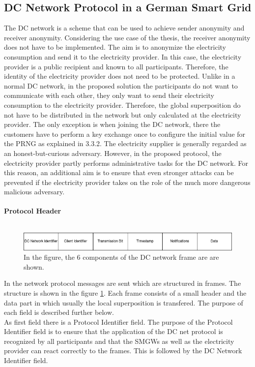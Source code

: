 \subsection{DC Network Protocol in a German Smart Grid}
The DC network is a scheme that can be used to achieve sender anonymity and receiver anonymity. Considering the use case of the thesis, the receiver anonymity does not have to be implemented. The aim is to anonymize the electricity consumption and send it to the electricity provider. In this case, the electricity provider is a public recipient and known to all participants. Therefore, the identity of the electricity provider does not need to be protected. Unlike in a normal DC network, in the proposed solution the participants do not want to communicate with each other, they only want to send their electricity consumption to the electricity provider. Therefore, the global superposition do not have to be distributed in the network but only calculated at the electricity provider. The only exception is when joining the DC network, there the customers have to perform a key exchange once to configure the initial value for the PRNG as explained in 3.3.2. The electricity supplier is generally regarded as an honest-but-curious adversary. However, in the proposed protocol, the electricity provider partly performs administrative tasks for the DC network. For this reason, an additional aim is to ensure that even stronger attacks can be prevented if the electricity provider takes on the role of the much more dangerous malicious adversary. \\
\\
\textbf{Protocol Header}
\\
\\\begin{figure}[tbp]
  \centering
  \includegraphics[width=1\textwidth]{images/Header.png}
  \caption[DC Network Frame]{
In the figure, the 6 components of the DC network frame are
are shown.}
  \label{fig:frame}
\end{figure}In the network protocol messages are sent which are structured in frames. The structure is shown in the figure \ref{fig:frame}. Each frame consists of a small header and the data part in which usually the local superposition is transfered. The purpose of each field is described further below.\\
As first field there is a Protocol Identifier field. The purpose of the Protocol Identifier field is to ensure that the application of the DC net protocol is recognized by all participants and that the SMGWs as well as the electricity provider can react correctly to the frames. This is followed by the DC Network Identifier field.%
